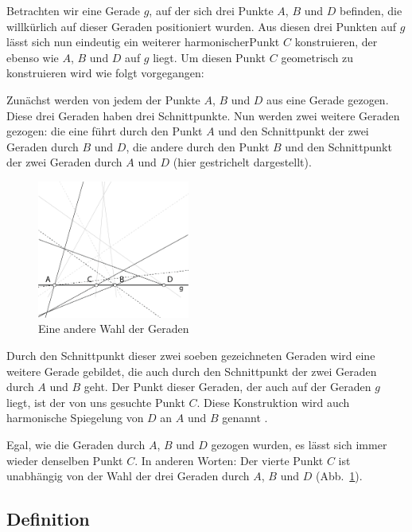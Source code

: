 \documentclass[12pt,a4paper]{article}
\begin{document}
Betrachten wir eine Gerade $g$, auf der sich drei Punkte $A$, $B$ und $D$ befinden, die willkürlich auf dieser Geraden positioniert wurden. Aus diesen drei Punkten auf $g$ lässt sich nun eindeutig ein weiterer \glqq harmonischer\grqq Punkt $C$ konstruieren, der ebenso wie $A$, $B$ und $D$ auf $g$ liegt. Um diesen Punkt $C$ geometrisch zu konstruieren wird wie folgt vorgegangen:

Zunächst werden von jedem der Punkte $A$, $B$ und $D$ aus eine Gerade gezogen. Diese drei Geraden haben drei Schnittpunkte. Nun werden zwei weitere Geraden gezogen: die eine führt durch den Punkt $A$ und den Schnittpunkt der zwei Geraden durch $B$ und $D$, die andere durch den Punkt $B$ und den Schnittpunkt der zwei Geraden durch $A$ und $D$ (hier gestrichelt dargestellt).

\begin{figure}
\centering
\includegraphics[width=5cm]{Bilder/fuer_mehrere_geraden.png}
\caption{Eine andere Wahl der Geraden}
\label{fig:AndereWahl}
\end{figure}

Durch den Schnittpunkt dieser zwei soeben gezeichneten Geraden wird eine weitere Gerade gebildet, die auch durch den Schnittpunkt der zwei Geraden durch $A$ und $B$ geht. Der Punkt dieser Geraden, der auch auf der Geraden $g$ liegt, ist der von uns gesuchte Punkt $C$. Diese Konstruktion wird auch harmonische Spiegelung von $D$ an $A$ und $B$ genannt \citep[vgl.~][S.~34]{harmonischeLage}.

Egal, wie die Geraden durch $A$, $B$ und $D$ gezogen wurden, es lässt sich immer wieder denselben Punkt $C$. In anderen Worten: Der vierte Punkt $C$ ist unabhängig von der Wahl der drei Geraden durch $A$, $B$ und $D$ (Abb.~\ref{fig:AndereWahl}).

\subsection{Definition}
\end{document}
